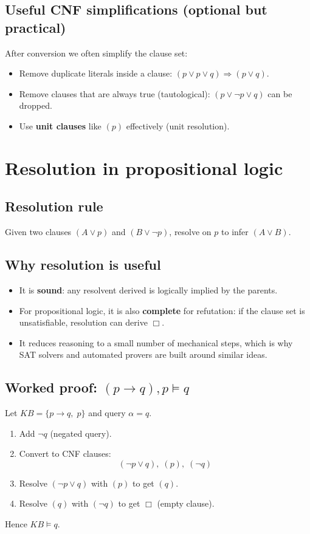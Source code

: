 \documentclass[11pt]{article}
\begin{document}
\subsection{Useful CNF simplifications (optional but practical)}
After conversion we often simplify the clause set:
\begin{itemize}[leftmargin=*]
  \item Remove duplicate literals inside a clause: $(p \lor p \lor q) \Rightarrow (p \lor q)$.
  \item Remove clauses that are always true (tautological): $(p \lor \lnot p \lor q)$ can be dropped.
  \item Use \textbf{unit clauses} like $(p)$ effectively (unit resolution).
\end{itemize}

\section{Resolution in propositional logic}
\subsection{Resolution rule}
Given two clauses $(A \lor p)$ and $(B \lor \lnot p)$, resolve on $p$ to infer $(A \lor B)$.

\subsection{Why resolution is useful}
\begin{itemize}[leftmargin=*]
  \item It is \textbf{sound}: any resolvent derived is logically implied by the parents.
  \item For propositional logic, it is also \textbf{complete} for refutation: if the clause set is unsatisfiable, resolution can derive $\Box$.
  \item It reduces reasoning to a small number of mechanical steps, which is why SAT solvers and automated provers are built around similar ideas.
\end{itemize}

\subsection{Worked proof: $(p\rightarrow q), p \models q$}
Let $KB=\{p\rightarrow q,\; p\}$ and query $\alpha=q$.
\begin{enumerate}[leftmargin=*]
  \item Add $\lnot q$ (negated query).
  \item Convert to CNF clauses:
  \[
    (\lnot p \lor q),\; (p),\; (\lnot q)
  \]
  \item Resolve $(\lnot p \lor q)$ with $(p)$ to get $(q)$.
  \item Resolve $(q)$ with $(\lnot q)$ to get $\Box$ (empty clause).
\end{enumerate}
Hence $KB \models q$.
\end{document}
